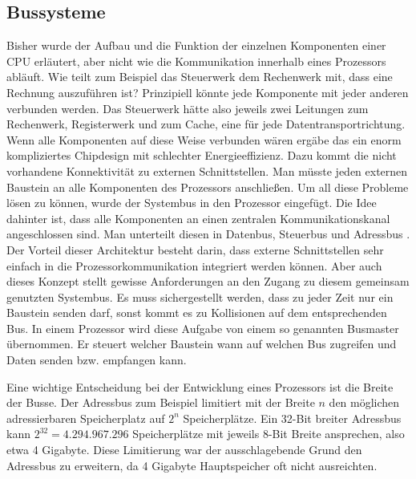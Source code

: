 \documentclass[12pt]{article}
\begin{document}
\subsection{Bussysteme}
Bisher wurde der Aufbau und die Funktion der einzelnen Komponenten einer CPU erläutert, aber nicht wie die Kommunikation innerhalb eines Prozessors abläuft. Wie teilt zum Beispiel das Steuerwerk dem Rechenwerk mit, dass eine Rechnung auszuführen ist? Prinzipiell könnte jede Komponente mit jeder anderen verbunden werden. Das Steuerwerk hätte also jeweils zwei Leitungen zum Rechenwerk, Registerwerk und zum Cache, eine für jede Datentransportrichtung. Wenn alle Komponenten auf diese Weise verbunden wären ergäbe das ein enorm kompliziertes Chipdesign mit schlechter Energieeffizienz. Dazu kommt die nicht vorhandene Konnektivität zu externen Schnittstellen. Man müsste jeden externen Baustein an alle Komponenten des Prozessors anschließen\cite{mikroprozessortechnik2011}. Um all diese Probleme lösen zu können, wurde der Systembus in den Prozessor eingefügt. Die Idee dahinter ist, dass alle Komponenten an einen zentralen Kommunikationskanal angeschlossen sind. Man unterteilt diesen in Datenbus, Steuerbus und Adressbus \cite[S.62]{mikroprozessortechnik2011}. Der Vorteil dieser Architektur besteht darin, dass externe Schnittstellen sehr einfach in die Prozessorkommunikation integriert werden können. Aber auch dieses Konzept stellt gewisse Anforderungen an den Zugang zu diesem gemeinsam genutzten Systembus. Es muss sichergestellt werden, dass zu jeder Zeit nur ein Baustein senden darf, sonst kommt es zu Kollisionen auf dem entsprechenden Bus. In einem Prozessor wird diese Aufgabe von einem so genannten Busmaster übernommen. Er steuert welcher Baustein wann auf welchen Bus zugreifen  und Daten senden bzw. empfangen kann.
\par\smallskip\noindent
Eine wichtige Entscheidung bei der Entwicklung eines Prozessors ist die Breite der Busse. Der Adressbus zum Beispiel limitiert mit der Breite $n$ den möglichen adressierbaren Speicherplatz auf $2^n$ Speicherplätze. Ein 32-Bit breiter Adressbus kann $2^{32} = 4.294.967.296$ Speicherplätze mit jeweils 8-Bit Breite ansprechen, also etwa 4 Gigabyte. Diese Limitierung war der ausschlagebende Grund den Adressbus zu erweitern, da 4 Gigabyte Hauptspeicher oft nicht ausreichten. 


\newpage
\end{document}
